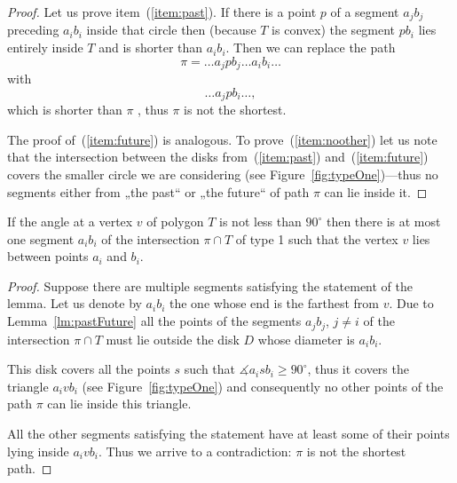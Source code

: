 \documentclass[a4paper,11pt]{article}
\begin{document}
\begin{figure}
	
\end{figure}

\begin{proof}

	Let us prove item~(\ref{item:past}). If there is a point $p$ of a segment $a_jb_j$ preceding $a_ib_i$ inside that circle then (because $T$ is convex) the segment $pb_i$ lies entirely inside $T$ and is shorter than $a_ib_i$. Then we can replace the path
	$$\pi = \ldots a_jpb_j \ldots a_ib_i \ldots$$
with
	$$\ldots a_jpb_i \ldots,$$
which is shorter than $\pi$ , thus $\pi$ is not the shortest.

	The proof of~(\ref{item:future}) is analogous. To prove~(\ref{item:noother}) let us note that the intersection between the disks from~(\ref{item:past}) and~(\ref{item:future}) covers the smaller circle we are considering (see Figure~\ref{fig:typeOne})—thus no segments either from „the past“ or „the future“ of path $\pi$ can lie inside it.

\end{proof}

\begin{lemma}
\label{lm:typeOne}
	If the angle at a vertex $v$ of polygon $T$ is not less than $90^\circ$ then there is at most one segment $a_ib_i$ of the intersection $\pi \cap T$ of type 1 such that the vertex $v$ lies between points $a_i$ and $b_i$.
\end{lemma}

\begin{figure}
	
\end{figure}

\begin{proof}

	Suppose there are multiple segments satisfying the statement of the lemma. Let us denote by $a_ib_i$ the one whose end is the farthest from $v$. Due to Lemma~\ref{lm:pastFuture} all the points of the segments $a_jb_j$, $j \ne i$ of the intersection $\pi \cap T$ must lie outside the disk $D$ whose diameter is $a_ib_i$.
	
	This disk covers all the points $s$ such that $\measuredangle a_isb_i \ge 90^\circ$, thus it covers the triangle $a_ivb_i$ (see Figure~\ref{fig:typeOne}) and consequently no other points of the path $\pi$ can lie inside this triangle.

	All the other segments satisfying the statement have at least some of their points lying inside $a_ivb_i$. Thus we arrive to a contradiction: $\pi$ is not the shortest path.

\end{proof}
\end{document}
